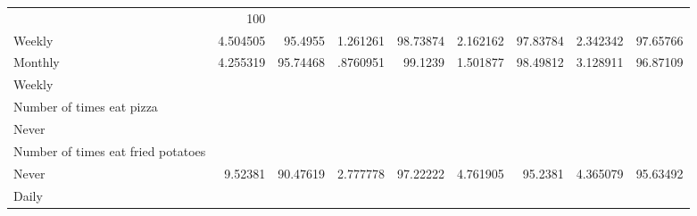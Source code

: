 \documentclass{article}
\begin{document}
\begin{tabular}{lllllllll}
  \multicolumn{1}{r}{} &
  \multicolumn{1}{r}{100} \\
\multicolumn{1}{l}{\hspace{7em}Weekly} &
  \multicolumn{1}{|r}{4.504505} &
  \multicolumn{1}{r}{95.4955} &
  \multicolumn{1}{r}{1.261261} &
  \multicolumn{1}{r}{98.73874} &
  \multicolumn{1}{r}{2.162162} &
  \multicolumn{1}{r}{97.83784} &
  \multicolumn{1}{r}{2.342342} &
  \multicolumn{1}{r}{97.65766} \\
\multicolumn{1}{l}{\hspace{7em}Monthly} &
  \multicolumn{1}{|r}{4.255319} &
  \multicolumn{1}{r}{95.74468} &
  \multicolumn{1}{r}{.8760951} &
  \multicolumn{1}{r}{99.1239} &
  \multicolumn{1}{r}{1.501877} &
  \multicolumn{1}{r}{98.49812} &
  \multicolumn{1}{r}{3.128911} &
  \multicolumn{1}{r}{96.87109} \\
\multicolumn{1}{l}{\hspace{3em}Weekly} &
  \multicolumn{1}{|r}{} &
  \multicolumn{1}{r}{} &
  \multicolumn{1}{r}{} &
  \multicolumn{1}{r}{} &
  \multicolumn{1}{r}{} &
  \multicolumn{1}{r}{} &
  \multicolumn{1}{r}{} &
  \multicolumn{1}{r}{} \\
\multicolumn{1}{l}{\hspace{4em}Number of times eat pizza} &
  \multicolumn{1}{|r}{} &
  \multicolumn{1}{r}{} &
  \multicolumn{1}{r}{} &
  \multicolumn{1}{r}{} &
  \multicolumn{1}{r}{} &
  \multicolumn{1}{r}{} &
  \multicolumn{1}{r}{} &
  \multicolumn{1}{r}{} \\
\multicolumn{1}{l}{\hspace{5em}Never} &
  \multicolumn{1}{|r}{} &
  \multicolumn{1}{r}{} &
  \multicolumn{1}{r}{} &
  \multicolumn{1}{r}{} &
  \multicolumn{1}{r}{} &
  \multicolumn{1}{r}{} &
  \multicolumn{1}{r}{} &
  \multicolumn{1}{r}{} \\
\multicolumn{1}{l}{\hspace{6em}Number of times eat fried potatoes} &
  \multicolumn{1}{|r}{} &
  \multicolumn{1}{r}{} &
  \multicolumn{1}{r}{} &
  \multicolumn{1}{r}{} &
  \multicolumn{1}{r}{} &
  \multicolumn{1}{r}{} &
  \multicolumn{1}{r}{} &
  \multicolumn{1}{r}{} \\
\multicolumn{1}{l}{\hspace{7em}Never} &
  \multicolumn{1}{|r}{9.52381} &
  \multicolumn{1}{r}{90.47619} &
  \multicolumn{1}{r}{2.777778} &
  \multicolumn{1}{r}{97.22222} &
  \multicolumn{1}{r}{4.761905} &
  \multicolumn{1}{r}{95.2381} &
  \multicolumn{1}{r}{4.365079} &
  \multicolumn{1}{r}{95.63492} \\
\multicolumn{1}{l}{\hspace{7em}Daily} &

\end{tabular}
\end{document}
